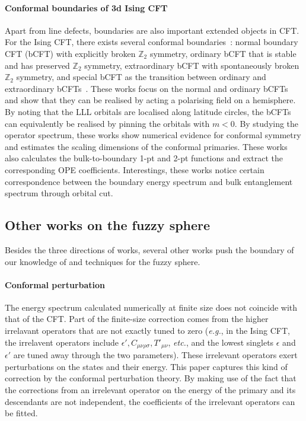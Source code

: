 \documentclass{timesjhep}
\begin{document}
\paragraph{Conformal boundaries of 3d Ising CFT~\cite{Zhou2024Jul,Dedushenko2024}}

Apart from line defects, boundaries are also important extended objects in CFT. For the Ising CFT, there exists several conformal boundaries~: normal boundary CFT (bCFT) with explicitly broken $\mathbb{Z}_2$ symmetry, ordinary bCFT that is stable and has preserved $\mathbb{Z}_2$ symmetry, extraordinary bCFT with spontaneously broken $\mathbb{Z}_2$ symmetry, and special bCFT as the transition between ordinary and extraordinary bCFTs~\cite{Metlitski2020IsingBd,Krishnan2023IsingBd,Giombi2023IsingBd}. These works focus on the normal and ordinary bCFTs and show that they can be realised by acting a polarising field on a hemisphere. By noting that the LLL orbitals are localised along latitude circles, the bCFTs can equivalently be realised by pinning the orbitals with $m<0$. By studying the operator spectrum, these works show numerical evidence for conformal symmetry and estimates the scaling dimensions of the conformal primaries. These works also calculates the bulk-to-boundary 1-pt and 2-pt functions and extract the corresponding OPE coefficients. Interestings, these works notice certain correspondence between the boundary energy spectrum and bulk entanglement spectrum through orbital cut. 

\subsection{Other works on the fuzzy sphere}

Besides the three directions of works, several other works push the boundary of our knowledge of and techniques for the fuzzy sphere. 

\paragraph{Conformal perturbation~\cite{Lao2023}}

The energy spectrum calculated numerically at finite size does not coincide with that of the CFT. Part of the finite-size correction comes from the higher irrelavant operators that are not exactly tuned to zero (\textit{e.g.}, in the Ising CFT, the irrelavent operators include $\epsilon', C_{\mu\nu\rho\sigma}, T'_{\mu\nu}$, \textit{etc.}, and the lowest singlets $\epsilon$ and $\epsilon'$ are tuned away through the two parameters). These irrelevant operators exert perturbations on the states and their energy. This paper captures this kind of correction by the conformal perturbation theory. By making use of the fact that the corrections from an irrelevant operator on the energy of the primary and its descendants are not independent, the coefficients of the irrelevant operators can be fitted. 
\end{document}

